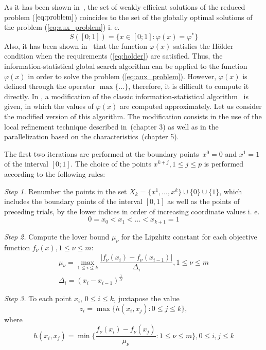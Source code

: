 \documentclass{llncs}
\begin{document}
As it has been shown in~\cite{markinStrongin1993}, the set of weakly efficient solutions of the
reduced problem (\(\ref{eq:problem}\)) coincides to the set of the globally optimal solutions of
the problem (\ref{eq:aux_problem}) i. e.
\begin{equation}
  \label{eq:s}
  S([0;1])=\{x\in [0;1]:\varphi(x)=\varphi^*\}
\end{equation}
Also, it has been shown in~\cite{markinStrongin1993} that the function \(\varphi(x)\) satisfies
the H\"older condition when the requirements (\ref{eq:holder}) are satisfied. Thus, the
information-statistical global search algorithm can be applied to the function \(\varphi(x)\) in
order to solve the problem (\ref{eq:aux_problem}). However, \(\varphi(x)\) is defined through
the operator \(\max\{...\}\), therefore, it is difficult to compute it directly. In
\cite{markinStrongin1993}, a modification of the classic information-statistical
algorithm~\cite{mixedAlg} is given, in which the values of \(\varphi(x)\) are computed
approximately. Let us consider the modified version of this algorithm. The modification
consists in the use of the local refinement technique described in~\cite{strOptBook}(chapter 3)
as well as in the parallelization based on the characteristics~\cite{strOptBook}(chapter 5).

The first two iterations are performed at the boundary points~\(x^0=0\) and \(x^1=1\) of the
interval \([0;1]\). The choice of the points \(x^{k+j}, 1\leqslant j\leqslant p\) is performed
according to the following rules:

\textit{Step 1.} Renumber the points in the set \(X_k=\{x^1,\dotsc,x^k\}\cup\{0\}\cup\{1\}\),
which includes the boundary points of the interval \([0,1]\) as well as the points of preceding
trials, by the lower indices in order of increasing coordinate values  i. e.
\begin{displaymath}
  0=x_0<x_1<\dotsc<x_{k+1}=1
\end{displaymath}

\textit{Step 2.} Compute the lover bound \(\mu_\nu\) for the Lipzhitz constant for each
objective function \(f_\nu(x),1\leqslant\nu\leqslant m\):
\begin{gather}
\label{eq:step2_1}
\mu_\nu=\max_{1\leqslant i\leqslant k}\dfrac{|f_\nu(x_i)-f_\nu(x_{i-1})|}{\Delta_i}, 1\leqslant
\nu\leqslant m \\
\label{eq:step2_2}
\Delta_i=(x_i-x_{i-1})^\frac{1}{N}
\end{gather}

\textit{Step 3.} To each point \(x_i\), \(0\leqslant i\leqslant k\), juxtapose the value
\begin{equation}
  z_i=\max\{h(x_i,x_j):0\leqslant j\leqslant k\},
\end{equation}
where
\begin{equation}
  h(x_i,x_j)=\min\{\frac{f_\nu(x_i)-f_\nu(x_j)}{\mu_\nu}:1\leqslant \nu\leqslant m\}, 0\leqslant
i,j\leqslant k
\end{equation}
\end{document}
